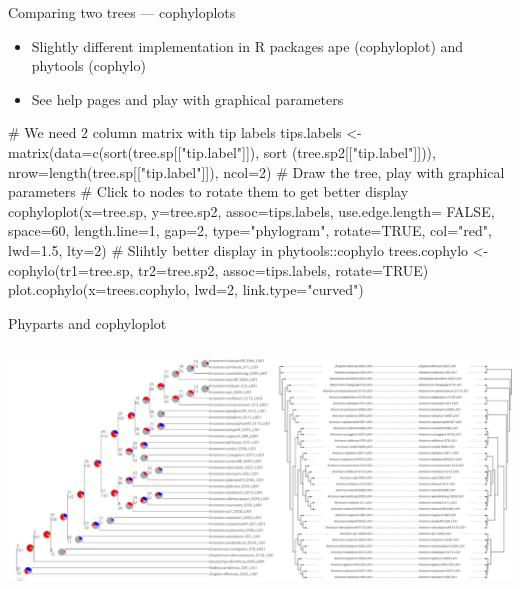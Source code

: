 \documentclass[compress, ucs, xelatex, 11pt, xcolor=x11names, aspectratio=169,
	hyperref={
		bookmarks=true,
		unicode=true,
		colorlinks=true,
		pdftitle={HybSeq course},
		plainpages=false,
		pdfauthor={Vojtech Zeisek},
		pdfsubject={Practical processing of HybSeq target enrichment sequencing data on computing grids like MetaCentrum},
		pdfcreator={XeLaTeX},
		pdfkeywords={BASH, command line, GNU, HybSeq, Linux, MetaCentrum, sequencing shell, target enrichment},
		linkcolor=Turquoise4, %
		anchorcolor=DodgerBlue4, %
		citecolor=DodgerBlue4, %
		filecolor=DodgerBlue4, %
		menucolor=Tan4, %
		urlcolor=DarkOliveGreen4, %
		pdftex},
	url={hyphens, lowtilde} %
	]{beamer}
\renewcommand{\texttt}[1]{\colorbox{Cornsilk2}{{\ttfamily #1}}}
\begin{document}
\begin{frame}[fragile]{Comparing two trees --- cophyloplots}
	\begin{itemize}
		\item Slightly different implementation in \texttt{R} packages \texttt{ape} (\texttt{cophyloplot}) and \texttt{phytools} (\texttt{cophylo})
		\item See help pages and play with graphical parameters
	\end{itemize}
	\begin{spluscode}
    # We need 2 column matrix with tip labels
    tips.labels <- matrix(data=c(sort(tree.sp[["tip.label"]]), sort
      (tree.sp2[["tip.label"]])), nrow=length(tree.sp[["tip.label"]]), ncol=2)
    # Draw the tree, play with graphical parameters
    # Click to nodes to rotate them to get better display
    cophyloplot(x=tree.sp, y=tree.sp2, assoc=tips.labels, use.edge.length=
      FALSE, space=60, length.line=1, gap=2, type="phylogram", rotate=TRUE,
      col="red", lwd=1.5, lty=2)
    # Slihtly better display in phytools::cophylo
    trees.cophylo <- cophylo(tr1=tree.sp, tr2=tree.sp2, assoc=tips.labels,
      rotate=TRUE)
    plot.cophylo(x=trees.cophylo, lwd=2, link.type="curved")
	\end{spluscode}
\end{frame}

\begin{frame}{Phyparts and cophyloplot}
	\begin{center}
		\includegraphics[height=6.5cm]{phyparts_cophylo.png}
	\end{center}
\end{frame}
\end{document}
